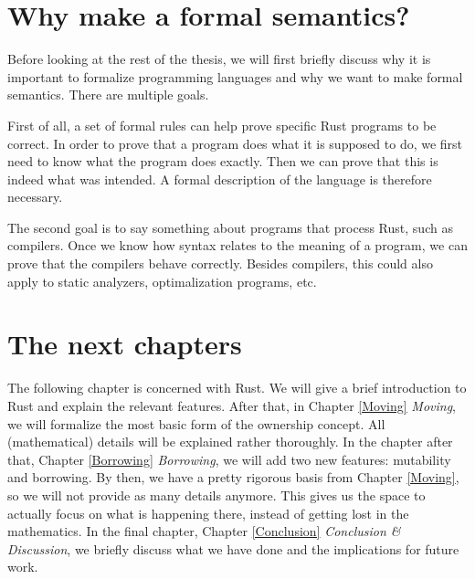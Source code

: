 \section{Why make a formal semantics?}
Before looking at the rest of the thesis, we will first briefly discuss why it is important to formalize programming languages and why we want to make formal semantics. There are multiple goals.

First of all, a set of formal rules can help prove specific Rust programs to be correct. In order to prove that a program does what it is supposed to do, we first need to know what the program does exactly. Then we can prove that this is indeed what was intended. A formal description of the language is therefore necessary. 

The second goal is to say something about programs that process Rust, such as compilers. Once we know how syntax relates to the meaning of a program, we can prove that the compilers behave correctly. Besides compilers, this could also apply to static analyzers, optimalization programs, etc.

\section{The next chapters}
The following chapter is concerned with Rust. We will give a brief introduction to Rust and explain the relevant features. After that, in Chapter \ref{Moving} \emph{Moving}, we will formalize the most basic form of the ownership concept. All (mathematical) details will be explained rather thoroughly. In the chapter after that, Chapter \ref{Borrowing} \emph{Borrowing}, we will add two new features: mutability and borrowing. By then, we have a pretty rigorous basis from Chapter \ref{Moving}, so we will not provide as many details anymore. This gives us the space to actually focus on what is happening there, instead of getting lost in the mathematics. In the final chapter, Chapter \ref{Conclusion} \emph{Conclusion \& Discussion}, we briefly discuss what we have done and the implications for future work. 

